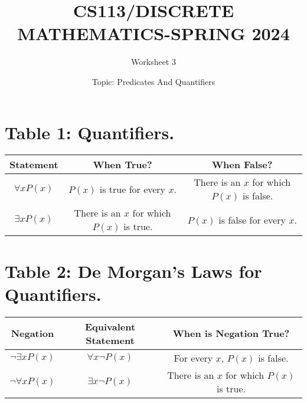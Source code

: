 \documentclass{exam}
\title{CS113/DISCRETE MATHEMATICS-SPRING 2024}
\author{Worksheet 3}
\date{Topic: Predicates And Quantifiers}
\begin{document}
\maketitle

\begin{center}
\end{center}

\vspace{5mm}

\vspace{5mm}

\section{Table 1: Quantifiers. }
\vspace{5mm}
\begin{center}
\begin{tabular}{|c|c|c|}
  \hline
  Statement & When True? & When False? \\
  \hline
  $\forall x P(x)$ & $P(x)$ is true for every $x$. & There is an $x$ for which $P(x)$ is false. \\
  $\exists x P(x)$ & There is an $x$ for which $P(x)$ is true. & $P(x)$ is false for every $x$. \\
  \hline
\end{tabular}
\end{center}
\vspace{5mm}
\section{Table 2: De Morgan’s Laws for Quantifiers.}
\begin{center}
\begin{tabular}{|c|c|c|}
  \hline
  Negation & Equivalent Statement & When is Negation True? \\
  \hline
  $\lnot\exists x P(x)$ & $\forall x \lnot P(x)$ & For every $x$, $P(x)$ is false. \\
  $\lnot\forall x P(x)$ & $\exists x \lnot P(x)$ & There is an $x$ for which $P(x)$ is true. \\
  \hline
\end{tabular}
\end{center}
\vspace{5mm}
\end{document}
